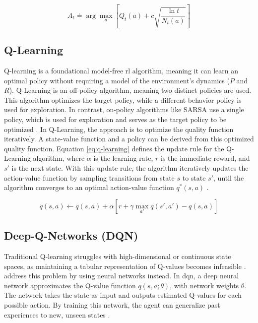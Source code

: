 \begin{equation}\label{eq:upper-confidence-bound}
A_t \doteq \arg\max_a \left[ Q_t(a) + c \sqrt{\frac{\ln t}{N_t(a)}} \right]
\end{equation}

\subsection{Q-Learning}
Q-learning is a foundational model-free \gls{rl} algorithm, meaning it can learn an optimal policy without requiring a model of the environment's dynamics ($P$ and $R$).
Q-Learning is an off-policy algorithm, meaning two distinct policies are used.
This algorithm optimizes the target policy, while a different behavior policy is used for exploration.
In contrast, on-policy algorithms like SARSA use a single policy, which is used for exploration and serves as the target policy to be optimized \cite{sutton_reinforcement_2018}.
In Q-Learning, the approach is to optimize the quality function iteratively.
A state-value function and a policy can be derived from this optimized quality function.
Equation \ref{eq:q-learning} defines the update rule for the Q-Learning algorithm, where $\alpha$ is the learning rate, $r$ is the immediate reward, and $s'$ is the next state.
With this update rule, the algorithm iteratively updates the action-value function by sampling transitions from state $s$ to state $s'$, until the algorithm converges to an optimal action-value function $q^*(s, a)$ \cite{zhang_dive_2023}.

\begin{equation}\label{eq:q-learning}
    q(s,a) \leftarrow q(s,a) + \alpha \left[ r + \gamma \max_{a'} q(s',a') - q(s,a) \right]
\end{equation}

\subsection{Deep-Q-Networks (DQN)}\label{sec:background-reinforcement_learning-dqn}
Traditional Q-learning struggles with high-dimensional or continuous state spaces, as maintaining a tabular representation of Q-values becomes infeasible \cite{mnih_human-level_2015}.
 address this problem by using neural networks instead.
In \gls{dqn}, a deep neural network approximates the Q-value function $q(s, a;\theta)$, with network weights $\theta$.
The network takes the state as input and outputs estimated Q-values for each possible action.
By training this network, the agent can generalize past experiences to new, unseen states \cite{mnih_human-level_2015}.

